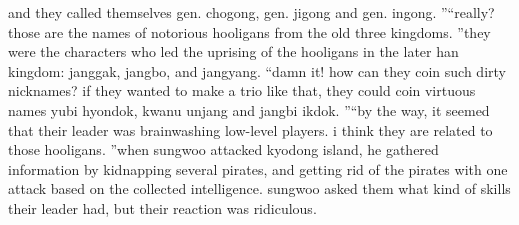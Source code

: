  and they called themselves gen.
 chogong, gen.
 jigong and gen.
 ingong.
”“really? those are the names of notorious hooligans from the old three kingdoms.
”they were the characters who led the uprising of the hooligans in the later han kingdom: janggak, jangbo, and jangyang.
“damn it! how can they coin such dirty nicknames? if they wanted to make a trio like that, they could coin virtuous names yubi hyondok, kwanu unjang and jangbi ikdok.
”“by the way, it seemed that their leader was brainwashing low-level players.
 i think they are related to those hooligans.
”when sungwoo attacked kyodong island, he gathered information by kidnapping several pirates, and getting rid of the pirates with one attack based on the collected intelligence.
sungwoo asked them what kind of skills their leader had, but their reaction was ridiculous.


 
